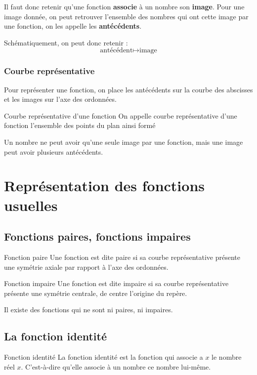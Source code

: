\documentclass[11pt]{article}
\begin{document}
Il faut donc retenir qu'une fonction \textbf{associe} à un nombre son \textbf{image}. Pour une
image donnée, on peut retrouver l'ensemble des nombres qui ont cette image par
une fonction, on les appelle les \textbf{antécédents}.

Schématiquement, on peut donc retenir :
\[
    \textrm{antécédent} \mapsto \textrm{image}
\]

\subsubsection{Courbe représentative}
\label{sec:org4c3b471}

Pour représenter une fonction, on place les antécédents sur la courbe des
abscisses et les images sur l'axe des ordonnées.

 \begin{defi}{Courbe représentative d'une fonction}
On appelle courbe représentative d'une fonction l'ensemble des points du plan
ainsi formé
 \end{defi}

\begin{rem}
Un nombre ne peut avoir qu'une seule image par une fonction, mais une image peut avoir plusieurs antécédents.
\end{rem}
\section{Représentation des fonctions usuelles}
\label{sec:org7b4e92b}

\subsection{Fonctions paires, fonctions impaires}
\label{sec:org5a299aa}

\begin{defi}{Fonction paire}
Une fonction est dite paire si sa courbe représentative présente une symétrie
axiale par rapport à l'axe des ordonnées.
\end{defi}


\begin{defi}{Fonction impaire}
Une fonction est dite impaire si sa courbe représentative présente une symétrie
centrale, de centre l'origine du repère.
\end{defi}

\begin{rem}
Il existe des fonctions qui ne sont ni paires, ni impaires.
\end{rem}
\subsection{La fonction identité}
\label{sec:org4cc68a2}
\begin{defi}{Fonction identité}
 La fonction identité est la fonction qui associe a $x$ le nombre réel $x$. C'est-à-dire qu'elle associe à un nombre ce nombre lui-même.
\end{defi}
\end{document}
